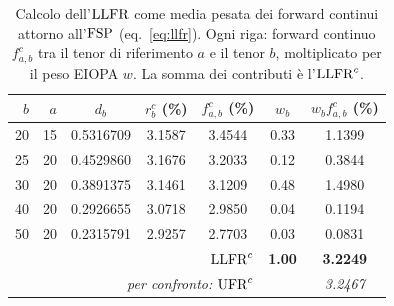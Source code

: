 \begin{table}[H]\centering\small
\caption{Calcolo dell'$\mathrm{LLFR}$ come media pesata dei forward continui attorno all'$\mathrm{FSP}$ (eq.~\eqref{eq:llfr}). Ogni riga: forward continuo $f^c_{a,b}$ tra il tenor di riferimento $a$ e il tenor $b$, moltiplicato per il peso EIOPA $w$. La somma dei contributi \`e l'$\mathrm{LLFR}^c$.}
\label{tab:llfr-calcolo}\renewcommand{\arraystretch}{1.2}
\begin{tabular}{rrccccc}
\toprule
$b$ & $a$ & $d_b$ & $r^c_b$ (\%) & $f^c_{a,b}$ (\%) & $w_b$ & $w_b f^c_{a,b}$ (\%)\\
\midrule
\rowcolor{rowtint}20 & 15 & 0.5316709 & 3.1587 & 3.4544 & 0.33 & 1.1399\\
25 & 20 & 0.4529860 & 3.1676 & 3.2033 & 0.12 & 0.3844\\
\rowcolor{rowtint}30 & 20 & 0.3891375 & 3.1461 & 3.1209 & 0.48 & 1.4980\\
40 & 20 & 0.2926655 & 3.0718 & 2.9850 & 0.04 & 0.1194\\
\rowcolor{rowtint}50 & 20 & 0.2315791 & 2.9257 & 2.7703 & 0.03 & 0.0831\\
\midrule
\multicolumn{5}{r}{\textbf{$\mathrm{LLFR}^c$}} & \textbf{1.00} & \textbf{3.2249}\\
\multicolumn{5}{r}{\textit{per confronto:} $\mathrm{UFR}^c$} & & \textit{3.2467}\\
\bottomrule
\end{tabular}
\end{table}
